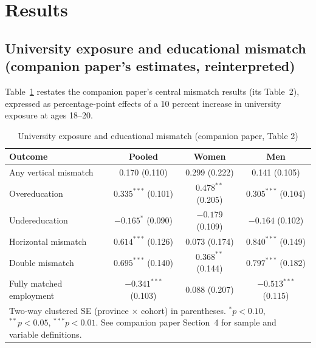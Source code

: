 \documentclass[11pt]{article}
\begin{document}
\section{Results}

\subsection{University exposure and educational mismatch (companion paper's estimates, reinterpreted)}

Table~\ref{tab:mismatch} restates the companion paper's central mismatch results (its Table~2), expressed as percentage-point effects of a 10 percent increase in university exposure at ages 18--20.

\begin{table}[htbp]
\centering
\caption{University exposure and educational mismatch (companion paper, Table 2)}
\label{tab:mismatch}
\begin{tabular}{lccc}
\toprule
Outcome & Pooled & Women & Men \\
\midrule
Any vertical mismatch      & 0.170 (0.110)      & 0.299 (0.222)      & 0.141 (0.105) \\
Overeducation              & $0.335^{***}$ (0.101) & $0.478^{**}$ (0.205) & $0.305^{***}$ (0.104) \\
Undereducation             & $-0.165^{*}$ (0.090)  & $-0.179$ (0.109)     & $-0.164$ (0.102) \\
Horizontal mismatch        & $0.614^{***}$ (0.126) & $0.073$ (0.174)      & $0.840^{***}$ (0.149) \\
Double mismatch            & $0.695^{***}$ (0.140) & $0.368^{**}$ (0.144)  & $0.797^{***}$ (0.182) \\
Fully matched employment   & $-0.341^{***}$ (0.103) & $0.088$ (0.207)     & $-0.513^{***}$ (0.115) \\
\bottomrule
\multicolumn{4}{p{0.9\textwidth}}{\footnotesize Two-way clustered SE (province $\times$ cohort) in parentheses. $^{*}p<0.10$, $^{**}p<0.05$, $^{***}p<0.01$. See companion paper Section~4 for sample and variable definitions.}
\end{tabular}
\end{table}
\end{document}
